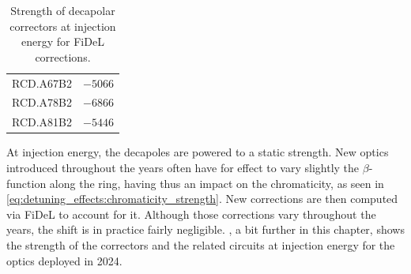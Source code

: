 \begin{table}
\begin{tabular}{lr}
        \hspace{2mm}RCD.A67B2 & $-5066$ \\
        \hspace{2mm}RCD.A78B2 & $-6866$ \\
        \hspace{2mm}RCD.A81B2 & $-5446$ \\
        \bottomrule
    \end{tabular}
    \caption{Strength of decapolar correctors at injection energy for FiDeL corrections.}
    \label{tab:decapoles:strength_rcd_fidel}
\end{table}

At injection energy, the decapoles are powered to a static strength. New optics introduced
throughout the years often have for effect to vary slightly the $\beta$-function along the ring,
having thus an impact on the chromaticity, as seen in
\cref{eq:detuning_effects:chromaticity_strength}. New corrections are then computed via FiDeL to
account for it.
Although those corrections vary throughout the years, the shift is in practice fairly negligible.
, a bit further in this chapter, shows the strength of
the correctors and the related circuits at injection energy for the optics deployed in 2024.